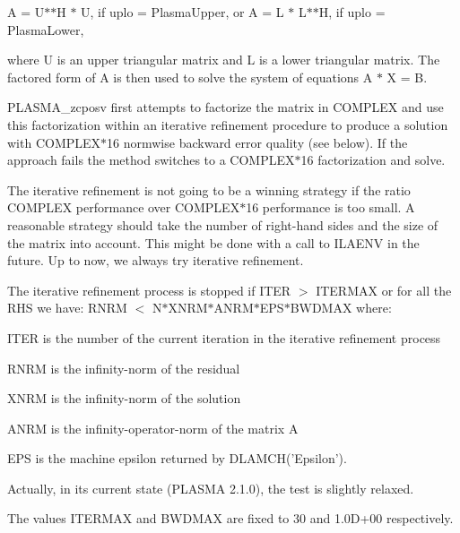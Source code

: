 A = U$\ast$$\ast$H $\ast$ U, if uplo = PlasmaUpper, or A = L $\ast$ L$\ast$$\ast$H, if uplo = PlasmaLower,

where U is an upper triangular matrix and L is a lower triangular matrix. The factored form of A is then used to solve the system of equations A $\ast$ X = B.

PLASMA\_\-zcposv first attempts to factorize the matrix in COMPLEX and use this factorization within an iterative refinement procedure to produce a solution with COMPLEX$\ast$16 normwise backward error quality (see below). If the approach fails the method switches to a COMPLEX$\ast$16 factorization and solve.

The iterative refinement is not going to be a winning strategy if the ratio COMPLEX performance over COMPLEX$\ast$16 performance is too small. A reasonable strategy should take the number of right-\/hand sides and the size of the matrix into account. This might be done with a call to ILAENV in the future. Up to now, we always try iterative refinement.

The iterative refinement process is stopped if ITER $>$ ITERMAX or for all the RHS we have: RNRM $<$ N$\ast$XNRM$\ast$ANRM$\ast$EPS$\ast$BWDMAX where:


\begin{DoxyItemize}
\item ITER is the number of the current iteration in the iterative refinement process
\item RNRM is the infinity-\/norm of the residual
\item XNRM is the infinity-\/norm of the solution
\item ANRM is the infinity-\/operator-\/norm of the matrix A
\item EPS is the machine epsilon returned by DLAMCH('Epsilon').
\end{DoxyItemize}

Actually, in its current state (PLASMA 2.1.0), the test is slightly relaxed.

The values ITERMAX and BWDMAX are fixed to 30 and 1.0D+00 respectively.


